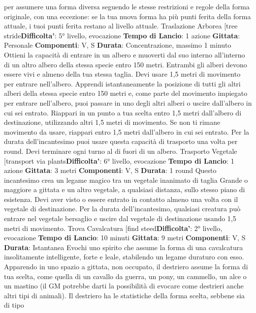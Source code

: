 \begin{multicols}{2}
per assumere una forma diversa seguendo le stesse
restrizioni e regole della forma originale, con una
eccezione: se la tua nuova forma ha più punti ferita
della forma attuale, i tuoi punti ferita restano al livello
attuale.
Traslazione Arborea
[tree stride\textbf{Difficolta'}:
5° livello, evocazione
\textbf{Tempo di Lancio}: 1 azione
\textbf{Gittata}: Personale
\textbf{Componenti}: V, S
\textbf{Durata}: Concentrazione, massimo 1 minuto
Ottieni la capacità di entrare in un albero e muoverti dal
suo interno all’interno di un altro albero della stessa
specie entro 150 metri. Entrambi gli alberi devono
essere vivi e almeno della tua stessa taglia. Devi usare
1,5 metri di movimento per entrare nell’albero. Apprendi
istantaneamente la posizione di tutti gli altri alberi della
stessa specie entro 150 metri e, come parte del
movimento impiegato per entrare nell’albero, puoi
passare in uno degli altri alberi o uscire dall’albero in cui
sei entrato. Riappari in un punto a tua scelta entro 1,5
metri dall’albero di destinazione, utilizzando altri 1,5
metri di movimento. Se non ti rimane movimento da
usare, riappari entro 1,5 metri dall’albero in cui sei
entrato.
Per la durata dell’incantesimo puoi usare questa
capacità di trasporto una volta per round. Devi
terminare ogni turno al di fuori di un albero.
Trasporto Vegetale
[transport via plants\textbf{Difficolta'}:
6° livello, evocazione
\textbf{Tempo di Lancio}: 1 azione
\textbf{Gittata}: 3 metri
\textbf{Componenti}: V, S
\textbf{Durata}: 1 round
Questo incantesimo crea un legame magico tra un
vegetale inanimato di taglia Grande o maggiore a
gittata e un altro vegetale, a qualsiasi distanza, sullo
stesso piano di esistenza. Devi aver visto o essere
entrato in contatto almeno una volta con il vegetale di
destinazione. Per la durata dell’incantesimo, qualsiasi
creatura può entrare nel vegetale bersaglio e uscire dal
vegetale di destinazione usando 1,5 metri di
movimento.
Trova Cavalcatura
[find steed\textbf{Difficolta'}:
2° livello, evocazione
\textbf{Tempo di Lancio}: 10 minuti
\textbf{Gittata}: 9 metri
\textbf{Componenti}: V, S
\textbf{Durata}: Istantanea
Evochi uno spirito che assume la forma di una
cavalcatura insolitamente intelligente, forte e leale,
stabilendo un legame duraturo con esso. Apparendo in
uno spazio a gittata, non occupato, il destriero assume
la forma di tua scelta, come quella di un cavallo da
guerra, un pony, un cammello, un alce o un mastino (il
GM potrebbe darti la possibilità di evocare come
destrieri anche altri tipi di animali). Il destriero ha le
statistiche della forma scelta, sebbene sia di tipo

\end{multicols}
